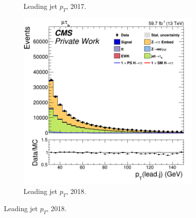 \begin{figure}
\begin{subfigure}[b]{0.33\linewidth}
    \caption{Leading jet $p_T$, 2017.} 
    \vspace{0.5ex}
  \end{subfigure} 
    \begin{subfigure}[b]{0.33\linewidth}
    \centering
    \includegraphics[width=\linewidth]{Chapitre7/Images/CtrlPlots/2018/LeadingJetpT.png} 
    \caption{Leading jet $p_T$, 2018.} 
    \vspace{0.5ex}
  \end{subfigure} 


\end{figure}
